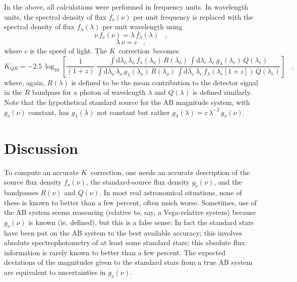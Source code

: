 \documentclass[preprint]{aastex}
\newcommand{\kcorrection}{$K$~correction}
\newcommand{\lambdaobs}{\lambda_o}
\newcommand{\lambdaemit}{\lambda_e}
\begin{document}
In the above, all calculations were performed in frequency units.  In
wavelength units, the spectral density of flux $f_{\nu}(\nu)$ per unit
frequency is replaced with the spectral density of flux
$f_{\lambda}(\lambda)$ per unit wavelength using
\begin{equation}
\nu\,f_{\nu}(\nu) = \lambda\,f_{\lambda}(\lambda) \;\;\;,
\end{equation}
\begin{equation}
\lambda\,\nu = c \;\;\;,
\end{equation}
where $c$ is the speed of light.  The \kcorrection\ becomes
\begin{equation}
\label{eq:wavelength}
K_{QR} = -2.5\,\log_{10}\left[\frac{1}{(1+z)}\,
  \frac{\displaystyle
  \int\mathrm{d}\lambdaobs\,\lambdaobs\,f_{\lambda}(\lambdaobs)\,R(\lambdaobs)\,
    \int\mathrm{d}\lambdaemit\,\lambdaemit\,
    g_{\lambda}(\lambdaemit)\,     Q(\lambdaemit)}
       {\displaystyle
  \int\mathrm{d}\lambdaobs\,\lambdaobs\,g_{\lambda}(\lambdaobs)\,R(\lambdaobs)\,
    \int\mathrm{d}\lambdaemit\,\lambdaemit\,
    f_{\lambda}(\lambdaemit[1+z])\,Q(\lambdaemit)}
\right] \;\;\;,
\end{equation}
where, again, $R(\lambda)$ is defined to be the mean contribution to
the detector signal in the $R$ bandpass for a photon of wavelength
$\lambda$ and $Q(\lambda)$ is defined similarly.  Note that the
hypothetical standard source for the AB magnitude system, with
$g_{\nu}(\nu)$ constant, has $g_{\lambda}(\lambda)$ not constant but
rather $g_{\lambda}(\lambda)= c\,\lambda^{-2}\,g_{\nu}(\nu)$.

\section{Discussion}

To compute an accurate \kcorrection, one needs an accurate description
of the source flux density $f_{\nu}(\nu)$, the standard-source flux
density $g_{\nu}(\nu)$, and the bandpasses $R(\nu)$ and $Q(\nu)$.  In
most real astronomical situations, none of these is known to better
than a few percent, often much worse.  Sometimes, use of the AB system
seems reassuring (relative to, say, a Vega-relative system) because
$g_{\nu}(\nu)$ is known (ie, defined), but this is a false sense: In
fact the standard stars have been put on the AB system to the best
available accuracy; this involves absolute spectrophotometry of at
least some standard stars; this absolute flux information is rarely
known to better than a few percent.  The expected deviations of the
magnitudes given to the standard stars from a true AB system are
equivalent to uncertainties in $g_{\nu}(\nu)$.
\end{document}
